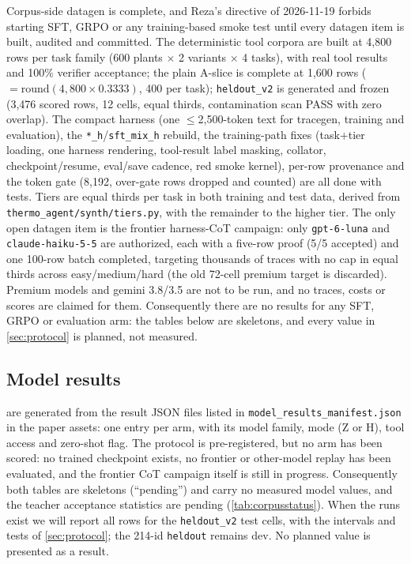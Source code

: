 Corpus-side datagen is complete, and Reza's directive of 2026-11-19 forbids starting SFT, GRPO or any training-based smoke test until every datagen item is built, audited and committed. The deterministic tool corpora are built at 4,800 rows per task family (600 plants $\times$ 2 variants $\times$ 4 tasks), with real tool results and 100\% verifier acceptance; the plain A-slice is complete at 1,600 rows ($=\mathrm{round}(4{,}800\times0.3333)$, 400 per task); \texttt{heldout\_v2} is generated and frozen (3,476 scored rows, 12 cells, equal thirds, contamination scan PASS with zero overlap). The compact harness (one $\le$2,500-token text for tracegen, training and evaluation), the \texttt{*\_h}/\texttt{sft\_mix\_h} rebuild, the training-path fixes (task+tier loading, one harness rendering, tool-result label masking, collator, checkpoint/resume, eval/save cadence, red smoke kernel), per-row provenance and the token gate (8,192, over-gate rows dropped and counted) are all done with tests. Tiers are equal thirds per task in both training and test data, derived from \texttt{thermo\_agent/synth/tiers.py}, with the remainder to the higher tier. The only open datagen item is the frontier harness-CoT campaign: only \texttt{gpt-6-luna} and \texttt{claude-haiku-5-5} are authorized, each with a five-row proof (5/5 accepted) and one 100-row batch completed, targeting thousands of traces with no cap in equal thirds across easy/medium/hard (the old 72-cell premium target is discarded). Premium models and gemini 3.8/3.5 are not to be run, and no traces, costs or scores are claimed for them. Consequently there are no results for any SFT, GRPO or evaluation arm: the tables below are skeletons, and every value in \cref{sec:protocol} is planned, not measured.

\subsection{Model results}\label{sec:modelresults}

 are generated from the result JSON files listed in
\texttt{model\_results\_manifest.json} in the paper assets: one entry per arm, with its model family, mode (Z or H),
tool access and zero-shot flag. The protocol is pre-registered, but no arm has been scored: no trained checkpoint exists, no frontier or other-model replay has been evaluated, and the frontier CoT campaign itself is still in progress. Consequently both tables are skeletons (``pending'') and carry no measured model values, and the teacher acceptance statistics are pending (\cref{tab:corpusstatus}). When
the runs exist we will report all rows for the \texttt{heldout\_v2} test cells, with the intervals and tests of \cref{sec:protocol}; the 214-id \texttt{heldout} remains dev. No planned value is presented as a result.

